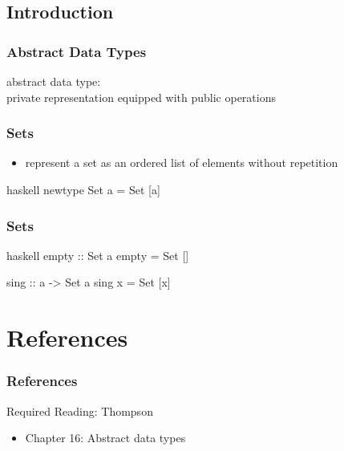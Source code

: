 \documentclass[dvipsnames]{beamer}
\theoremstyle{plain}
\begin{document}
\subsection{Introduction}

\begin{frame}
  \frametitle{Abstract Data Types}

  \begin{definition}
    \alert{abstract data type}:\\
      private representation equipped with public operations
  \end{definition}
\end{frame}

\begin{frame}[fragile]
  \frametitle{Sets}

  \begin{itemize}
    \item represent a set as an ordered list of elements without repetition
  \end{itemize}

  \begin{exampleblock}{}
    \begin{pygments}{haskell}
newtype Set a = Set [a]
    \end{pygments}
  \end{exampleblock}
\end{frame}

\begin{frame}[fragile]
  \frametitle{Sets}

  \begin{exampleblock}{}
    \begin{pygments}{haskell}
empty :: Set a
empty = Set []

sing :: a -> Set a
sing x = Set [x]
    \end{pygments}
  \end{exampleblock}
\end{frame}

\section*{References}

\begin{frame}
  \frametitle{References}

  \begin{block}{Required Reading: Thompson}
    \begin{itemize}
      \item Chapter 16: \alert{Abstract data types}
    \end{itemize}
  \end{block}
\end{frame}
\end{document}
